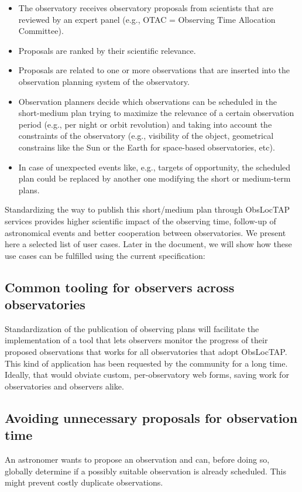 \documentclass[11pt,a4paper]{ivoa}
\begin{document}
\begin{itemize}
	\item The observatory receives observatory proposals from scientists that are reviewed by an expert panel (e.g., OTAC = Observing Time Allocation Committee). \par

	\item Proposals are ranked by their scientific relevance.

	\item Proposals are related to one or more observations that are inserted into the observation planning system of the observatory.

	\item Observation planners decide which observations can be scheduled in the short-medium plan trying to maximize the relevance of a certain observation period (e.g., per night or orbit revolution) and taking into account the constraints of the observatory (e.g., visibility of the object, geometrical constrains like the Sun or the Earth for space-based observatories, etc).

	\item In case of unexpected events like, e.g., targets of opportunity, the scheduled plan could be replaced by another one modifying the short or medium-term plans.
\end{itemize}

Standardizing the way to publish this short/medium plan through ObsLocTAP services provides 
higher scientific impact of the observing time, follow-up of astronomical events and 
better cooperation between observatories. We present here a selected list of user cases. 
Later in the document, we will show how these use cases can be fulfilled using the current specification:

\subsection{Common tooling for observers across observatories}
Standardization of the publication of observing plans will facilitate the implementation 
of a tool that lets observers monitor the progress of their proposed observations that 
works for all observatories that adopt ObsLocTAP. This kind of application has been 
requested by the community for a long time. Ideally, that would obviate custom, 
per-observatory web forms, saving work for observatories and observers alike. 

\subsection{Avoiding unnecessary proposals for observation time}
An astronomer wants to propose an observation and can, before doing so, globally 
determine if a possibly suitable observation is already scheduled.  This might prevent 
costly duplicate observations. 
\end{document}
